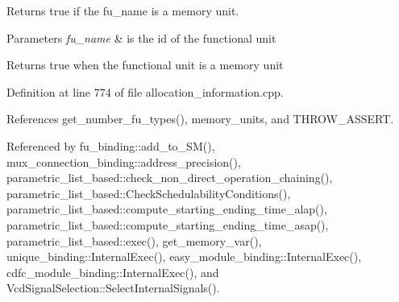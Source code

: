 Returns true if the fu\+\_\+name is a memory unit. 


\begin{DoxyParams}{Parameters}
{\em fu\+\_\+name} & is the id of the functional unit \\
\hline
\end{DoxyParams}
\begin{DoxyReturn}{Returns}
true when the functional unit is a memory unit 
\end{DoxyReturn}


Definition at line 774 of file allocation\+\_\+information.\+cpp.



References get\+\_\+number\+\_\+fu\+\_\+types(), memory\+\_\+units, and T\+H\+R\+O\+W\+\_\+\+A\+S\+S\+E\+RT.



Referenced by fu\+\_\+binding\+::add\+\_\+to\+\_\+\+S\+M(), mux\+\_\+connection\+\_\+binding\+::address\+\_\+precision(), parametric\+\_\+list\+\_\+based\+::check\+\_\+non\+\_\+direct\+\_\+operation\+\_\+chaining(), parametric\+\_\+list\+\_\+based\+::\+Check\+Schedulability\+Conditions(), parametric\+\_\+list\+\_\+based\+::compute\+\_\+starting\+\_\+ending\+\_\+time\+\_\+alap(), parametric\+\_\+list\+\_\+based\+::compute\+\_\+starting\+\_\+ending\+\_\+time\+\_\+asap(), parametric\+\_\+list\+\_\+based\+::exec(), get\+\_\+memory\+\_\+var(), unique\+\_\+binding\+::\+Internal\+Exec(), easy\+\_\+module\+\_\+binding\+::\+Internal\+Exec(), cdfc\+\_\+module\+\_\+binding\+::\+Internal\+Exec(), and Vcd\+Signal\+Selection\+::\+Select\+Internal\+Signals().

